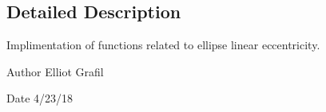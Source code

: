 \subsection{Detailed Description}
Implimentation of functions related to ellipse linear eccentricity. 

\begin{DoxyAuthor}{Author}
Elliot Grafil 
\end{DoxyAuthor}
\begin{DoxyDate}{Date}
4/23/18 
\end{DoxyDate}
